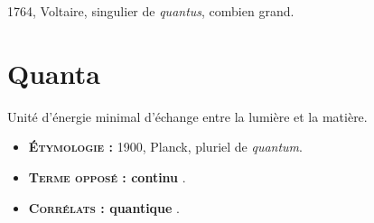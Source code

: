  1764, Voltaire, singulier de {\it quantus}, combien grand.

\section{Quanta} {\bf }

Unité d'énergie minimal d'échange entre la lumière et la matière.

{\footnotesize
\begin{itemize}[leftmargin=1cm, label=, itemsep=1pt]
\item {\bf \textsc{Étymologie} :} 1900, Planck, pluriel de {\it quantum}.
\item {\bf \textsc{Terme opposé} : continu} .
\item {\bf \textsc{Corrélats} : quantique} .
\end{itemize}
}
